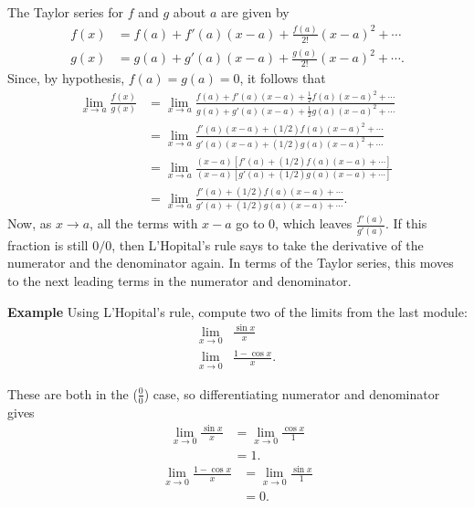 \documentclass[twoside,openright,titlepage,a4paper]{book}
\begin{document}
\begin{sloppypar}
\begin{examplebox}
The Taylor series for $f$ and $g$ about $a$ are given by
\begin{align*}
f(x) &= f(a) + f'(a)(x-a) + \frac{f(a)}{2!}(x-a)^2+ \dotsb \\
g(x) &= g(a) + g'(a)(x-a) + \frac{g(a)}{2!}(x-a)^2 + \dotsb. 
\end{align*}
Since, by hypothesis, $f(a) = g(a) = 0$, it follows that
\begin{align*}
\lim_{x\rightarrow a} \frac{f(x)}{g(x)} &= \lim_{x \rightarrow a} \frac{ f(a) + f'(a)(x-a) + \frac{1}{2}f(a)(x-a)^2 + \dotsb}{g(a) + g'(a)(x-a) + \frac{1}{2}g(a)(x-a)^2+\dotsb} \\
&= \lim_{x\rightarrow a} \frac{f'(a) (x-a) +(1/2)f(a)(x-a)^2 + \dotsb}{g'(a)(x-a) + (1/2)g(a)(x-a)^2+ \dotsb} \\
&= \lim_{x \rightarrow a} \frac{(x-a)\left[f'(a) + (1/2)f(a)(x-a) + \dotsb \right]}{(x-a)\left[g'(a) + (1/2)g(a)(x-a) + \dotsb \right]} \\
&= \lim_{x \rightarrow a} \frac{f'(a) + (1/2)f(a)(x-a) + \dotsb }{g'(a) + (1/2) g(a)(x-a) + \dotsb}.
\end{align*}
Now, as $x \rightarrow a$, all the terms with $x-a$ go to 0, which leaves $\frac{f'(a)}{g'(a)}$. If this fraction is still $0/0$, then L'Hopital's rule says to take the derivative of the numerator and the denominator again. In terms of the Taylor series, this moves to the next leading terms in the numerator and denominator.
\end{examplebox}

\textbf{Example} Using L'Hopital's rule, compute two of the limits from the last module:
\begin{align*}
\lim_{x \rightarrow 0} & \frac{\sin x}{x} \\
\lim_{x \rightarrow 0} & \frac{1-\cos x}{x}. 
\end{align*}
\begin{examplebox}
These are both in the ($\frac{0}{0}$) case, so differentiating numerator and denominator gives
\begin{align*}
\lim_{x \rightarrow 0} \frac{\sin x}{x} &= \lim_{x \rightarrow 0} \frac{\cos x}{1} \\
&= 1. 
\end{align*}
\begin{align*}
\lim_{x \rightarrow 0} \frac{1-\cos x}{x} &= \lim_{x \rightarrow 0} \frac{\sin x}{1} \\
&= 0.
\end{align*}
\end{examplebox}


\end{sloppypar}
\end{document}
